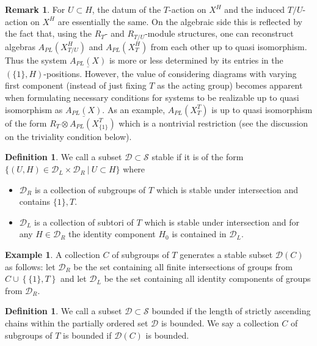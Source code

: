 \documentclass[12pt,a4paper]{article}
\theoremstyle{definition}
\newtheorem{rem}[thm]{Remark}
\newtheorem{defn}[thm]{Definition}
\newtheorem{ex}[thm]{Example}
\begin{document}
\begin{rem}
For $U\subset H$, the datum of the $T$-action on $X^H$ and the induced $T/U$-action on $X^H$ are essentially the same. On the algebraic side this is reflected by the fact that, using the ${R}_T$- and $R_{T/U}$-module structures, one can reconstruct algebras $A_{PL}(X^H_{T/U})$ and $A_{PL}(X^H_T)$ from each other up to quasi isomorphism. Thus the system $\underline{A_{PL}(X)}$ is more or less determined by its entries in the $(\{1\},H)$-positions. However, the value of considering diagrams with varying first component (instead of just fixing $T$ as the acting group) becomes apparent when formulating necessary conditions for systems to be realizable up to quasi isomorphism as $\underline{A_{PL}(X)}$. As an example, $A_{PL}(X^T_T)$ is up to quasi isomorphism of the form $R_T\otimes A_{PL}(X^T_{\{1\}})$ which is a nontrivial restriction (see the discussion on the triviality condition below).
\end{rem}


\begin{defn}
We call a subset $\mathcal{D}\subset \mathcal{S}$ stable if it is of the form $\{(U,H)\in \mathcal{D}_L\times \mathcal{D}_R~|~U\subset H\}$ where
\begin{itemize}
\item $\mathcal{D}_R$ is a collection of subgroups of $T$ which is stable under intersection and contains $\{1\},T$.
\item $\mathcal{D}_L$ is a collection of subtori of $T$ which is stable under intersection and for any $H\in \mathcal{D}_R$ the identity component $H_0$ is contained in $\mathcal{D}_L$.
\end{itemize}
\end{defn}

\begin{ex}
A collection $C$ of subgroups of $T$ generates a stable subset $\mathcal{D}(C)$ as follows: let $\mathcal{D}_R$ be the set containing all finite intersections of groups from $C\cup\left\{\{1\},T\right\}$ and let $\mathcal{D}_L$ be the set containing all identity components of groups from $\mathcal{D}_R$.
\end{ex}

\begin{defn}
We call a subset $\mathcal{D}\subset \mathcal{S}$ bounded if the length of strictly ascending chains within the partially ordered set $\mathcal{D}$ is bounded. We say a collection $C$ of subgroups of $T$ is bounded if $\mathcal{D}(C)$ is bounded.
\end{defn}
\end{document}
